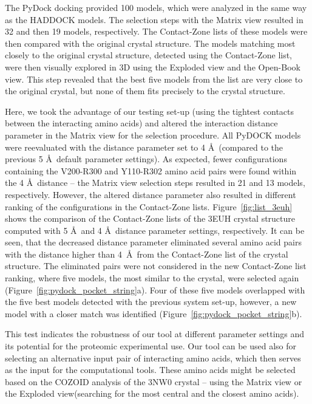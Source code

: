 \documentclass{bmcart}
\def\OpBook {Open-Book view\xspace}
\def\ExpView {Exploded view\xspace}
\def\MatView {Matrix view\xspace}
\def\CoZoList{Contact-Zone list\xspace}
\def\CoZoLists{Contact-Zone lists\xspace}
\begin{document}
The PyDock docking provided 100 models, which were analyzed in the same way as the HADDOCK models. 
The selection steps with the \MatView resulted in 32 and then 19 models, respectively. 
The \CoZoLists of these models were then compared with the original crystal structure.
The models matching most closely to the original crystal structure, detected using the \CoZoList, were then visually explored in 3D using the \ExpView and the \OpBook.
This step revealed that the best five models from the list are very close to the original crystal, but none of them fits precisely to the crystal structure.

Here, we took the advantage of our testing set-up (using the tightest contacts between the interacting amino acids) and altered the interaction distance parameter in the \MatView for the selection procedure. 
All PyDOCK models were reevaluated with the distance parameter set to 4 \AA~(compared to the previous 5 \AA~default parameter settings). 
As expected, fewer configurations containing the V200-R300 and Y110-R302 amino acid pairs were found within the 4 \AA~distance -- the \MatView selection steps resulted in 21 and 13 models, respectively.
However, the altered distance parameter also resulted in different ranking of the configurations in the \CoZoLists.
Figure~\ref{fig:list_3euh} shows the comparison of the \CoZoLists of the 3EUH crystal structure computed with 5 \AA~and 4 \AA~distance parameter settings, respectively.
It can be seen, that the decreased distance parameter eliminated several amino acid pairs with the distance higher than 4~\AA~from the \CoZoList of the crystal structure.
The eliminated pairs were not considered in the new \CoZoList ranking, where five models, the most similar to the crystal, were selected again (Figure~\ref{fig:pydock_pocket_string}a). 
Four of these five models overlapped with the five best models detected with the previous system set-up, however, a new model with a closer match was identified (Figure~\ref{fig:pydock_pocket_string}b).

This test indicates the robustness of our tool at different parameter settings and its potential for the proteomic experimental use.
Our tool can be used also for selecting an alternative input pair of interacting amino acids, which then serves as the input for the computational tools.
These amino acids might be selected based on the COZOID analysis of the 3NW0 crystal -- using the \MatView or the \ExpView (searching for the most central and the closest amino acids).
\end{document}
